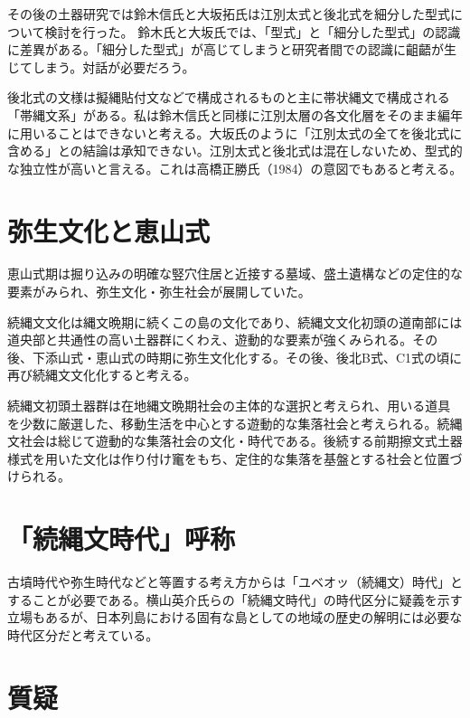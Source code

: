 \documentclass[a4j,11pt,twocolumn,openany]{jsbook}
\begin{document}
その後の土器研究では鈴木信氏と大坂拓氏は江別太式と後北式を細分した型式について検討を行った。
鈴木氏と大坂氏では、「型式」と「細分した型式」の認識に差異がある。「細分した型式」が高じてしまうと研究者間での認識に齟齬が生じてしまう。対話が必要だろう。

後北式の文様は擬縄貼付文などで構成されるものと主に帯状縄文で構成される「帯縄文系」がある。私は鈴木信氏と同様に江別太層の各文化層をそのまま編年に用いることはできないと考える。大坂氏のように「江別太式の全てを後北式に含める」との結論は承知できない。江別太式と後北式は混在しないため、型式的な独立性が高いと言える。これは高橋正勝氏（1984）の意図でもあると考える。

\section{弥生文化と恵山式}

恵山式期は掘り込みの明確な竪穴住居と近接する墓域、盛土遺構などの定住的な要素がみられ、弥生文化・弥生社会が展開していた。

続縄文文化は縄文晩期に続くこの島の文化であり、続縄文文化初頭の道南部には道央部と共通性の高い土器群にくわえ、遊動的な要素が強くみられる。その後、下添山式・恵山式の時期に弥生文化化する。その後、後北B式、C{\footnotesize 1}式の頃に再び続縄文文化化すると考える。

続縄文初頭土器群は在地縄文晩期社会の主体的な選択と考えられ、用いる道具を少数に厳選した、移動生活を中心とする遊動的な集落社会と考えられる。続縄文社会は総じて遊動的な集落社会の文化・時代である。後続する前期擦文式土器様式を用いた文化は作り付け竃をもち、定住的な集落を基盤とする社会と位置づけられる。

\section{「続縄文時代」呼称}

古墳時代や弥生時代などと等置する考え方からは「ユベオッ（続縄文）時代」とすることが必要である。横山英介氏らの「続縄文時代」の時代区分に疑義を示す立場もあるが、日本列島における固有な島としての地域の歴史の解明には必要な時代区分だと考えている。

\section{質疑}
\end{document}
